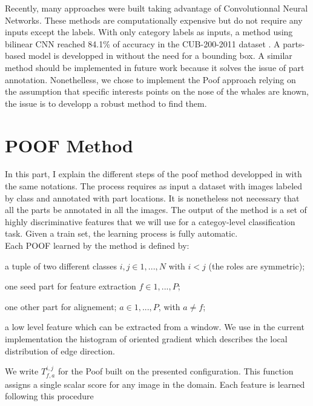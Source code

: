 \documentclass[twoside]{article}
\begin{document}
\begin{multicols}{2}
Recently, many approaches were built taking advantage of Convolutionnal Neural Networks. These methods are computationally expensive but do not require any inputs except the labels. With only category labels as inputs, a method using bilinear CNN \cite{cnn} reached 84.1\% of accuracy in the CUB-200-2011 dataset \cite{cub}. A parts-based model is developped in \cite{cnn1} without the need for a bounding box. A similar method should be implemented in future work because it solves the issue of part annotation. Nonethelless, we chose to implement the Poof approach relying on the assumption that specific interests points on the nose of the whales are known, the issue is to developp a robust method to find them. 

\section{POOF Method}

In this part, I explain the different steps of the poof method developped in \cite{poof} with the same notations. The process requires as input a dataset with images labeled by class and annotated with part locations. It is nonetheless not necessary that all the parts be annotated in all the images. The output of the method is a set of highly discriminative features that we will use for a categoy-level classification task. Given a train set, the learning process is fully automatic.\\

Each POOF learned by the method is defined by:

\begin{compactitem}
	\item a tuple of two different classes $i,j \in {1,..., N}$ with $i<j$ (the roles are symmetric);
	\item one seed part for feature extraction $f \in {1,..., P}$;
	\item one other part for alignement; $a \in {1, ..., P}$, with $a \neq f$;
	\item a low level feature which can be extracted from a window. We use in the current implementation the histogram of oriented gradient which describes the local distribution of edge direction.
\end{compactitem}


We write $T^{i,j}_{f,a}$ for the Poof built on the presented configuration. This function assigns a single scalar score for any image in the domain. Each feature is learned following this procedure


\end{multicols}
\end{document}
